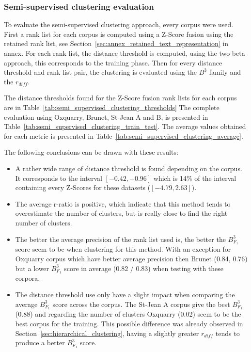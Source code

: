 \subsubsection{Semi-supervised clustering evaluation}

To evaluate the semi-supervised clustering approach, every corpus were used.
First a rank list for each corpus is computed using a Z-Score fusion using the retained rank list, see Section~\ref{sec:annex_retained_text_representation} in annex.
For each rank list, the distance threshold is computed, using the two beta approach, this corresponds to the training phase.
Then for every distance threshold and rank list pair, the clustering is evaluated using the $B^3$ family and the $r_{diff}$.

The distance thresholds found for the Z-Score fusion rank lists for each corpus are in Table~\ref{tab:semi_supervised_clustering_thresholds}
The complete evaluation using Oxquarry, Brunet, St-Jean A and B, is presented in Table~\ref{tab:semi_supervised_clustering_train_test}.
The average values obtained for each metric is presented in Table~\ref{tab:semi_supervised_clustering_average}.

The following conclusions can be drawn with these results:
\begin{itemize}
  \item
  A rather wide range of distance threshold is found depending on the corpus.
  It corresponds to the interval $\left[-0.42, -0.96\right]$ which is 14\% of the interval containing every Z-Scores for these datasets ($\left[-4.79, 2.63\right]$).
  \item
  The average r-ratio is positive, which indicate that this method tends to overestimate the number of clusters, but is really close to find the right number of clusters.
  \item
  The better the average precision of the rank list used is, the better the $B^3_{F_1}$ score seem to be when clustering for this method.
  With an exception for Oxquarry corpus which have better average precision then Brunet (0.84, 0.76) but a lower $B^3_{F_1}$ score in average (0.82 / 0.83) when testing with these corpora.
  \item
  The distance threshold use only have a slight impact when comparing the average $B^3_{F_1}$ score across the corpus.
  The St-Jean A corpus give the best $B^3_{F_1}$ (0.88) and regarding the number of clusters Oxquarry (0.02) seem to be the best corpus for the training.
  This possible difference was already observed in Section~\ref{sec:hierarchical_clustering}, having a slightly greater $r_{diff}$ tends to produce a better $B^3_{F_1}$ score.
\end{itemize}

